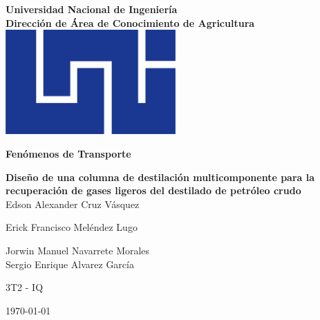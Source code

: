 \documentclass[man, floatsintext]{apa7}
\newcommand{\nsp}[1]{\\\vspace{#1}}
\begin{document}
\begin{titlepage}
    \setcounter{page}{1}
    \thispagestyle{headings}
    \begin{center}
        {\Large
            \textbf{Universidad Nacional de Ingeniería}
            \nsp{1em}
            \textbf{Dirección de Área de Conocimiento de Agricultura}
        }
        \nsp{2em}
        \includegraphics[height=4cm]{resources/images/uni.png}
        \nsp{1em}
        {\large
            \textbf{Fenómenos de Transporte}

            \textbf{Diseño de una columna de destilación multicomponente para la recuperación de gases ligeros del destilado de petróleo crudo}
            \nsp{1em}
            Edson Alexander Cruz Vásquez

            Erick Francisco Meléndez Lugo

            Jorwin Manuel Navarrete Morales
            \nsp{1em}
            Sergio Enrique Alvarez García

            3T2 - IQ

            \today
        }
    \end{center}
\end{titlepage}

\tableofcontents
\newpage


\newpage


\newpage


\newpage


\newpage


\newpage


\newpage

\nocite{*}
\printbibliography[heading=bibintoc]
\end{document}

